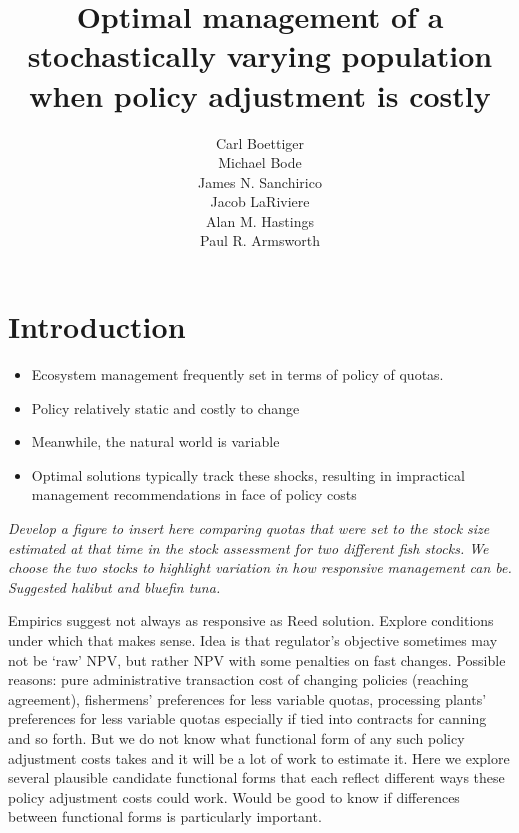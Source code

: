 \documentclass{article}\usepackage{graphicx, color}
\begin{document}
\title{Optimal management of a stochastically varying population when policy adjustment is costly} 


\author{Carl Boettiger    \\
       Michael Bode      \\
        James N. Sanchirico \\
Jacob LaRiviere \\
Alan M. Hastings\\
Paul R. Armsworth
}




\maketitle


\section{Introduction}



\begin{itemize}
  \item Ecosystem management frequently set in terms of policy of quotas. 
  \item Policy relatively static and costly to change
  \item Meanwhile, the natural world is variable
  \item Optimal solutions typically track these shocks, resulting in impractical management recommendations in face of policy costs
\end{itemize}

\emph{Develop a figure to insert here comparing quotas that were set to the stock size estimated at that time in the stock assessment for two different fish stocks. We choose the two stocks to highlight variation in how responsive management can be. Suggested halibut and bluefin tuna.}

Empirics suggest not always as responsive as Reed solution. Explore conditions under which that makes sense. Idea is that regulator’s objective sometimes may not be `raw' NPV, but rather NPV with some penalties on fast changes. Possible reasons: pure administrative transaction cost of changing policies (reaching agreement), fishermens' preferences for less variable quotas, processing plants' preferences for less variable quotas especially if tied into contracts for canning and so forth. But we do not know what functional form of any such policy adjustment costs takes and it will be a lot of work to estimate it. Here we explore several plausible candidate functional forms that each reflect different ways these policy adjustment costs could work. Would be good to know if differences between functional forms is particularly important.
\end{document}
